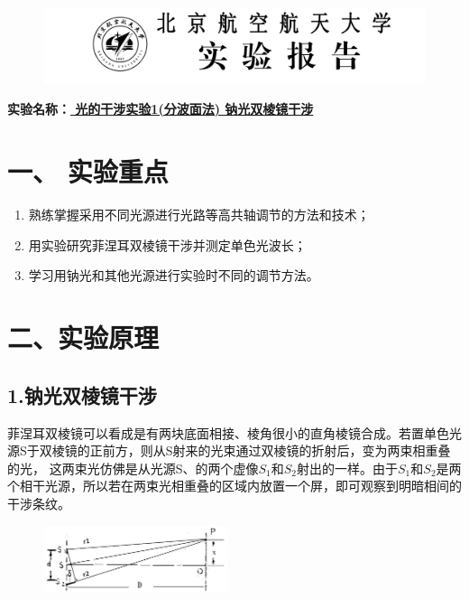 \documentclass[11pt,a4paper,oneside]{article}
\begin{document}
\begin{figure}[H]
 \centering
  \includegraphics[width=13cm]{Image/表头.png}
\end{figure}
\begin{center}
\textbf{{\large 实验名称：\uline{          光的干涉实验1(分波面法) 钠光双棱镜干涉      }}}
\end{center}

\section*{一、 实验重点}
\begin{enumerate}
 \item 熟练掌握采用不同光源进行光路等高共轴调节的方法和技术；
 \item 用实验研究菲涅耳双棱镜干涉并测定单色光波长；
 \item 学习用钠光和其他光源进行实验时不同的调节方法。
\end{enumerate}

\section*{二、实验原理}

\subsection*{1.钠光双棱镜干涉}
菲涅耳双棱镜可以看成是有两块底面相接、棱角很小的直角棱镜合成。若置单色光源S于双棱镜的正前方，则从S射来的光束通过双棱镜的折射后，变为两束相重叠的光，
这两束光仿佛是从光源S、的两个虚像$S_1$和$S_2$射出的一样。由于$S_1$和$S_2$是两个相干光源，所以若在两束光相重叠的区域内放置一个屏，即可观察到明暗相间的干涉条纹。

\begin{figure}
  \vspace{-20pt}
  \begin{center}
    \includegraphics[width=0.48\textwidth]{Image/ExperimentScience.png}
  \end{center}
  \vspace{-20pt}
  \vspace{-10pt}
\end{figure}
\end{document}
